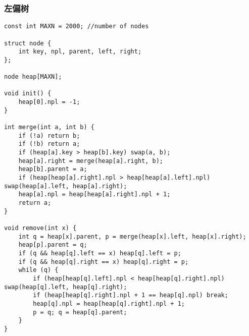 \subsubsection{左偏树}
\begin{verbatim}
const int MAXN = 2000; //number of nodes

struct node {
	int key, npl, parent, left, right;
};

node heap[MAXN];

void init() {
	heap[0].npl = -1;
}

int merge(int a, int b) {
	if (!a) return b;
	if (!b) return a;
	if (heap[a].key > heap[b].key) swap(a, b);
	heap[a].right = merge(heap[a].right, b);
	heap[b].parent = a;
	if (heap[heap[a].right].npl > heap[heap[a].left].npl) swap(heap[a].left, heap[a].right);
	heap[a].npl = heap[heap[a].right].npl + 1;
	return a;
}

void remove(int x) {
	int q = heap[x].parent, p = merge(heap[x].left, heap[x].right);
	heap[p].parent = q;
	if (q && heap[q].left == x) heap[q].left = p;
	if (q && heap[q].right == x) heap[q].right = p;
	while (q) {
		if (heap[heap[q].left].npl < heap[heap[q].right].npl) swap(heap[q].left, heap[q].right);
		if (heap[heap[q].right].npl + 1 == heap[q].npl) break;
		heap[q].npl = heap[heap[q].right].npl + 1;
		p = q; q = heap[q].parent;
	}
}
\end{verbatim}
